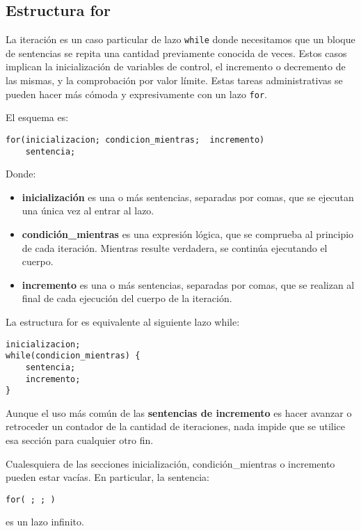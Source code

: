\subsection{Estructura for}

La iteración es un caso particular de lazo \lstinline{while} donde necesitamos que un
bloque de sentencias se repita una cantidad previamente conocida de veces.
Estos casos implican la inicialización de variables de control, el incremento o
decremento de las mismas, y la comprobación por valor límite.
Estas tareas administrativas se pueden hacer más cómoda y expresivamente con un
lazo \lstinline{for}. 

El esquema es:
\begin{lstlisting}
for(inicializacion; condicion_mientras;  incremento)
    sentencia;
\end{lstlisting}

Donde:
\begin{itemize}
	\item \textbf{inicialización} es una o más sentencias, separadas por comas, que se
      ejecutan una única vez al entrar al lazo.
	\item \textbf{condición\_mientras} es una expresión lógica, que se comprueba al principio
      de cada iteración. Mientras resulte verdadera, se continúa ejecutando el
      cuerpo.
	\item \textbf{incremento} es una o más sentencias, separadas por comas, que se realizan
      al final de cada ejecución del cuerpo de la iteración. 
\end{itemize}
    
La estructura for es equivalente al siguiente lazo while:
\begin{lstlisting}
inicializacion;
while(condicion_mientras) {
    sentencia;
    incremento;
}
\end{lstlisting}

Aunque el uso más común de las \textbf{sentencias de incremento} es hacer avanzar o retroceder
un contador de la cantidad de iteraciones, nada impide que se utilice esa
sección para cualquier otro fin. 

Cualesquiera de las secciones inicialización, condición\_mientras o incremento
pueden estar vacías. En particular, la sentencia:
\begin{lstlisting}
for( ; ; )
\end{lstlisting}
es un lazo infinito.

